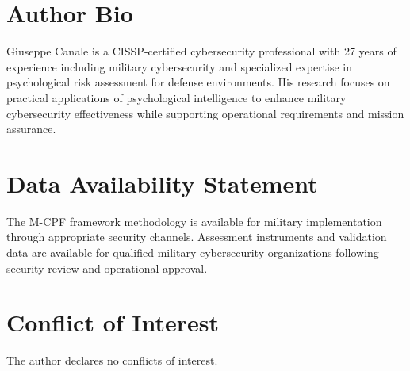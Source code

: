 \documentclass[10pt, twocolumn]{article}
\begin{document}
\section*{Author Bio}

Giuseppe Canale is a CISSP-certified cybersecurity professional with 27 years of experience including military cybersecurity and specialized expertise in psychological risk assessment for defense environments. His research focuses on practical applications of psychological intelligence to enhance military cybersecurity effectiveness while supporting operational requirements and mission assurance.

\section*{Data Availability Statement}

The M-CPF framework methodology is available for military implementation through appropriate security channels. Assessment instruments and validation data are available for qualified military cybersecurity organizations following security review and operational approval.

\section*{Conflict of Interest}

The author declares no conflicts of interest.
\end{document}
